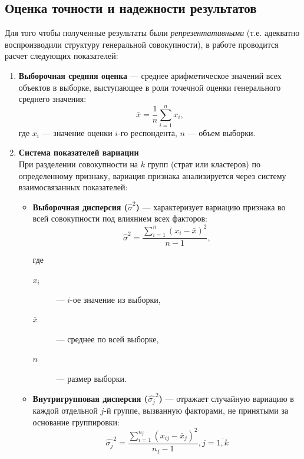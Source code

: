 \newpage

\subsection{Оценка точности и надежности результатов}
Для того чтобы полученные результаты были \textit{репрезентативными} (т.е. адекватно воспроизводили структуру генеральной совокупности), в работе проводится расчет следующих показателей:

\begin{enumerate}
    \item \textbf{Выборочная средняя оценка} --- среднее арифметическое значений всех объектов в выборке, выступающее в роли точечной оценки генерального среднего значения:
    \begin{equation}
        \label{eq:mean}
        \bar{x} = \frac{1}{n} \sum_{i=1}^{n} x_i  ,
    \end{equation}
    где $x_i$ --- значение оценки $i$-го респондента, $n$ --- объем выборки.

    \item \textbf{Система показателей вариации} \\
    При разделении совокупности на $k$ групп (страт или кластеров) по определенному признаку, вариация признака анализируется через систему взаимосвязанных показателей:

    \begin{itemize}
        \item \textbf{Выборочная дисперсия ($\hat{\sigma}^2$)} --- характеризует вариацию признака во всей совокупности под влиянием всех факторов:
        \begin{equation}
            \label{eq:var}
            \hat{\sigma}^2 = \frac{\sum_{i=1}^{n} (x_i - \bar{x})^2}{n-1}  ,
        \end{equation}

        где 
        \begin{description}
            \item[$x_i$] --- $i$-ое значение из выборки, 
            \item[$\bar{x}$] --- среднее по всей выборке, 
            \item[$n$] --- размер выборки.
        \end{description}

        \clearpage
        
        \item \textbf{Внутригрупповая дисперсия ($\hat{\sigma_j}^2$)} --- отражает случайную вариацию в каждой отдельной $j$-й группе, вызванную факторами, не принятыми за основание группировки:
        \begin{equation}
            \label{eq:var_within}
            \hat{\sigma_j}^2 = \frac{\sum_{i=1}^{n_j} (x_{ij} - \bar{x}_j)^2}{n_j - 1},  j=\overline{1,k}
        \end{equation}


\end{itemize}
\end{enumerate}
